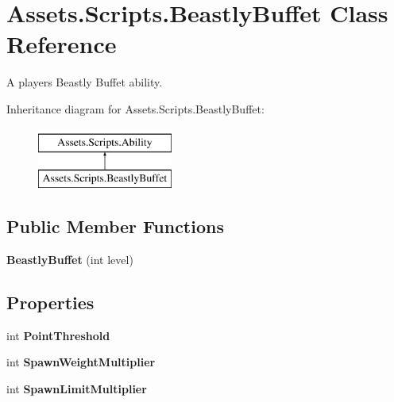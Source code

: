 \hypertarget{class_assets_1_1_scripts_1_1_beastly_buffet}{}\section{Assets.\+Scripts.\+Beastly\+Buffet Class Reference}
\label{class_assets_1_1_scripts_1_1_beastly_buffet}


A player\textquotesingle{}s Beastly Buffet ability.  


Inheritance diagram for Assets.\+Scripts.\+Beastly\+Buffet\+:\begin{figure}[H]
\begin{center}
\leavevmode
\includegraphics[height=2.000000cm]{class_assets_1_1_scripts_1_1_beastly_buffet}
\end{center}
\end{figure}
\subsection*{Public Member Functions}
\begin{DoxyCompactItemize}
\item 
{\bfseries Beastly\+Buffet} (int level)\hypertarget{class_assets_1_1_scripts_1_1_beastly_buffet_a084193e8eaafa2659b3e125fd1eb44c5}{}\label{class_assets_1_1_scripts_1_1_beastly_buffet_a084193e8eaafa2659b3e125fd1eb44c5}

\end{DoxyCompactItemize}
\subsection*{Properties}
\begin{DoxyCompactItemize}
\item 
int {\bfseries Point\+Threshold}\hypertarget{class_assets_1_1_scripts_1_1_beastly_buffet_ad85c00f66d568ef72a253ed384c2aca7}{}\label{class_assets_1_1_scripts_1_1_beastly_buffet_ad85c00f66d568ef72a253ed384c2aca7}

\item 
int {\bfseries Spawn\+Weight\+Multiplier}\hypertarget{class_assets_1_1_scripts_1_1_beastly_buffet_aceec0adc92629cb68b96b3cbcb2d7135}{}\label{class_assets_1_1_scripts_1_1_beastly_buffet_aceec0adc92629cb68b96b3cbcb2d7135}

\item 
int {\bfseries Spawn\+Limit\+Multiplier}\hypertarget{class_assets_1_1_scripts_1_1_beastly_buffet_a7ce5ba84da728e2806038d99b0e21ebe}{}\label{class_assets_1_1_scripts_1_1_beastly_buffet_a7ce5ba84da728e2806038d99b0e21ebe}

\end{DoxyCompactItemize}



